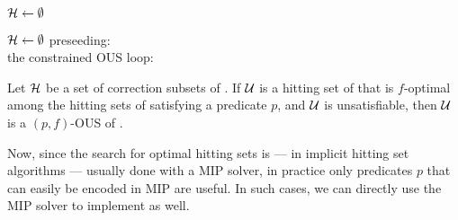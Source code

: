 \begin{algorithm}[ht]
  \DontPrintSemicolon
  $\mathcal{H}   \gets \emptyset$ \; %
  \caption{$\comus(\formula,f,p)$ }
  \label{alg:comus}
\end{algorithm}
\begin{algorithm}[ht]
$\mathcal{H}   \gets \emptyset$ \;
preseeding:\\
the constrained OUS loop:
  \While{true}{
    some appropriate modifications to $f$ in terms of infinity values... \\
    p = $\sum \bar{I} == 1$ or however this can be more nicely written \\
    $\F' \gets \cohs(\setstohit,f,p) $  \;%

    \If{ $\lnot \sat(\F')$}{
      \Return{$\F'$} \;
    }
    $\F'' \gets  \grow(\F',\F) $\;
    $\setstohit  \gets \setstohit  \cup \{  \formula \setminus \F''\}$ \;
  }
    \caption{$\call{SingleStepExplain2}(\formulag,f,I)$}
  \label{alg:singleStepExplain2}
  \label{alg:explainSingleStep2}
\end{algorithm}


\begin{proposition}\label{prop:K2}
  Let $\mathcal{H}$ be a set of correction subsets of \mcses{\formula}. 
  If $\mathcal{U}$ is a hitting set of  that is $f$-optimal among the hitting sets of  satisfying a predicate $p$, and  $\mathcal{U}$ is unsatisfiable, then $\mathcal{U}$ is a $(p,f)$-OUS of \formula. 
\end{proposition}

Now, since the search for optimal hitting sets is --- in implicit hitting set algorithms --- usually done with a MIP solver, in practice only predicates $p$ that can easily be encoded in MIP are useful. In such cases, we can directly use the MIP solver to implement \cohs as well. 

